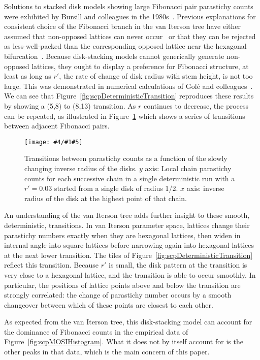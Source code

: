 \documentclass[a4paper,10pt]{amsart}
\newlength{\jfigwidth}
\newcommand{\pdffig}[3]{\jdofig{#1}{#2}{#3}{Figures}{.pdf}}
\newcommand{\jdofig}[5]{
	\begin{figure}\centering\texttt{[image: \#4/\#1\#5]} \caption{#2}\label{fig:#1}\end{figure}
}
\begin{document}
Solutions to stacked disk models showing large Fibonacci pair parastichy counts were exhibited by Bursill and colleagues in the 1980s~\cite{jeanBib41,jeanBib721}.  Previous explanations for consistent choice of the Fibonacci branch in the van Iterson tree have either assumed that non-opposed lattices can never occur~\cite{mitchisonPhyllotaxisFibonacciSeries1977} or that they can be rejected as less-well-packed than the corresponding opposed lattice near the hexagonal bifurcation~\cite{douadyCh21Phyllotactic1998}. Because disk-stacking models cannot generically generate non-opposed lattices, they ought to display a preference for Fibonacci structure, at least as long as $r'$, the rate of change of disk radius with stem height,  is not too large. This was demonstrated in  numerical calculations of Gol\'e and colleagues~\cite{goleFibonacciQuasisymmetricPhyllotaxis2016}. We can see that Figure~\ref{fig:scpDeterministicTransition} reproduces these results by showing a (5,8) to (8,13) transition.
As $r$ continues to decrease, the process can be repeated, as illustrated in  Figure~\ref{fig:scpParastichyCountsTo89} which shows a series of transitions between adjacent Fibonacci pairs.  
%
\pdffig{scpParastichyCountsTo89}{Transitions between parastichy counts as a function of the slowly changing inverse radius of the disks. $y$ axis: Local chain parastichy counts for each successive chain in a single
	deterministic run with a  $r'=0.03$ started from a single disk of radius 1/2. $x$ axis: inverse radius of the disk at the highest point of that chain.}{1}
%


An understanding of the van Iterson tree adds further insight to these smooth, deterministic, transitions. In van Iterson parameter space, lattices change their parastichy numbers exactly when they are hexagonal lattices, then widen in internal angle into square lattices before narrowing again into hexagonal lattices at the next lower transition.  The tiles of Figure~\ref{fig:scpDeterministicTransition} reflect this transition. Because $r'$ is small, the disk pattern at the transition is very close to a hexagonal lattice, and the transition is able to occur smoothly. In particular, the positions of lattice points above and below the transition are strongly correlated: the change of parastichy number occurs by a smooth changeover between which of these points are closest to each other. 



As expected from the van Iterson tree, this disk-stacking model can account for the dominance of Fibonacci counts in the empirical data of Figure~\ref{fig:scpMOSIHistogram}.  What it does not by itself account for is the other peaks in that data, which is the main concern of this paper. 
\end{document}
